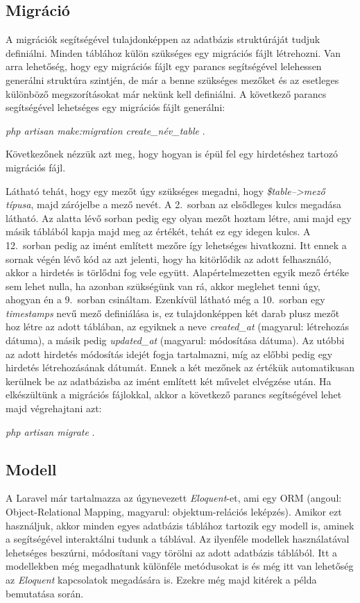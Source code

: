 \documentclass[]{thesis-ekf}
\theoremstyle{definition}
\theoremstyle{remark}
\begin{document}
	\subsection{Migráció}\label{sb-migracio}
		A migrációk segítségével tulajdonképpen az adatbázis struktúráját tudjuk definiálni. Minden táblához külön szükséges egy migrációs fájlt létrehozni. Van arra lehetőség, hogy egy migrációs fájlt egy parancs segítségével lelehessen generálni struktúra szintjén, de már a benne szükséges mezőket és az esetleges különböző megszorításokat már nekünk kell definiálni. A következő parancs segítségével lehetséges egy migrációs fájlt generálni:
		\begin{center} 
			\emph{php artisan make:migration create\_név\_table} .
		\end{center}
		Következőnek nézzük azt meg, hogy hogyan is épül fel egy hirdetéshez tartozó migrációs fájl.
	
		
		
		Látható tehát, hogy egy mezőt úgy szükséges megadni, hogy \emph{\$table-->mező típusa}, majd zárójelbe a mező nevét. A 2.~sorban az elsődleges kulcs megadása látható. Az alatta lévő sorban pedig egy olyan mezőt hoztam létre, ami majd egy másik táblából kapja majd meg az értékét, tehát ez egy idegen kulcs. A 12.~sorban pedig az imént említett mezőre így lehetséges hivatkozni. Itt ennek a sornak végén lévő kód az azt jelenti, hogy ha kitörlődik az adott felhasználó, akkor a hirdetés is törlődni fog vele együtt. Alapértelmezetten egyik mező értéke sem lehet nulla, ha azonban szükségünk van rá, akkor meglehet tenni úgy, ahogyan én a 9.~sorban csináltam. Ezenkívül látható még a 10.~sorban egy \emph{timestamps} nevű mező definiálása is, ez tulajdonképpen két darab plusz mezőt hoz létre az adott táblában, az egyiknek a neve \emph{created\_at} (magyarul: létrehozás dátuma), a másik pedig \emph{updated\_at} (magyarul: módosítása dátuma). Az utóbbi az adott hirdetés módosítás idejét fogja tartalmazni, míg az előbbi pedig egy hirdetés létrehozásának dátumát. Ennek a két mezőnek az értékük automatikusan kerülnek be az adatbázisba az imént említett két művelet elvégzése után. Ha elkészültünk a migrációs fájlokkal, akkor a következő parancs segítségével lehet majd végrehajtani azt:
		\begin{center}
			\emph{php artisan migrate} .
		\end{center}
	\subsection{Modell}
		A Laravel már tartalmazza az úgynevezett \emph{Eloquent}-et, ami egy ORM (angoul: Object-Relational Mapping, magyarul: objektum-relációs leképzés). Amikor ezt használjuk, akkor minden egyes adatbázis táblához tartozik egy modell is, aminek a segítségével interaktálni tudunk a táblával. Az ilyenféle modellek használatával lehetséges beszúrni, módosítani vagy törölni az adott adatbázis táblából. Itt a modellekben még megadhatunk különféle metódusokat is és még itt van lehetőség az \emph{Eloquent} kapcsolatok megadására is. Ezekre még majd kitérek a példa bemutatása során.\cite{Laravel}
		
\end{document}
